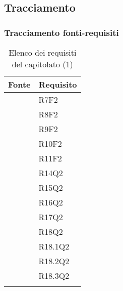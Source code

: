 %
%
%



	\subsection{Tracciamento}\label{Tracciamento}

		\subsubsection{Tracciamento fonti-requisiti}

		\begin{table}[H]
			\centering
			{\def\arraystretch{1.4}
			\begin{tabularx}{\textwidth}{YY}
				\textbf{Fonte} & \textbf{Requisito} \\
				\toprule
				 & R7F2 \\
				 & R8F2 \\
				 & R9F2 \\
				 & R10F2 \\
				 & R11F2 \\
				 & R14Q2 \\
				 & R15Q2 \\
				 & R16Q2 \\
				 & R17Q2 \\
				 & R18Q2 \\
				 & R18.1Q2 \\
				 & R18.2Q2 \\
				  & R18.3Q2 \\
				\bottomrule\\
			\end{tabularx}}
			\caption{Elenco dei requisiti del capitolato (1)}
		\end{table}

